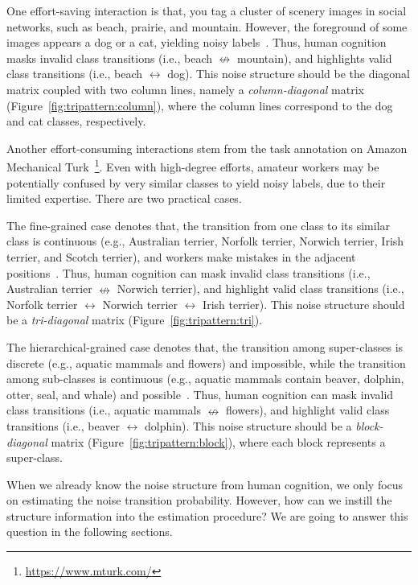 \documentclass{article}
\begin{document}
One effort-saving interaction is that, you tag a cluster of scenery images in social networks, such as beach, prairie, and mountain. However, the foreground of some images appears a dog or a cat, yielding noisy labels~\cite{ren2018learning}. Thus, human cognition masks invalid class transitions (i.e., beach $\nleftrightarrow$ mountain), and highlights valid class transitions (i.e., beach $\leftrightarrow$ dog). This noise structure should be the diagonal matrix coupled with two column lines, namely a \textit{column-diagonal} matrix (Figure~\ref{fig:tripattern:column}), where the column lines correspond to the dog and cat classes, respectively.

Another effort-consuming interactions stem from the task annotation on Amazon Mechanical Turk~\footnote{\url{https://www.mturk.com/}}. Even with high-degree efforts, amateur workers may be potentially confused by very similar classes to yield noisy labels, due to their limited expertise. There are two practical cases.

The fine-grained case denotes that, the transition from one class to its similar class is continuous (e.g., Australian terrier, Norfolk terrier, Norwich terrier, Irish terrier, and Scotch terrier), and workers make mistakes in the adjacent positions~\cite{deng2013fine}. Thus, human cognition can mask invalid class transitions (i.e., Australian terrier $\nleftrightarrow$ Norwich terrier), and highlight valid class transitions (i.e., Norfolk terrier $\leftrightarrow$ Norwich terrier $\leftrightarrow$ Irish terrier). This noise structure should be a \textit{tri-diagonal} matrix (Figure~\ref{fig:tripattern:tri}).

The hierarchical-grained case denotes that, the transition among super-classes is discrete (e.g., aquatic mammals and flowers) and impossible, while the transition among sub-classes is continuous (e.g., aquatic mammals contain beaver, dolphin, otter, seal, and whale) and possible~\cite{patrini2017making}. Thus, human cognition can mask invalid class transitions (i.e., aquatic mammals $\nleftrightarrow$ flowers), and highlight valid class transitions (i.e., beaver $\leftrightarrow$ dolphin). This noise structure should be a \textit{block-diagonal} matrix (Figure~\ref{fig:tripattern:block}), where each block represents a super-class.

When we already know the noise structure from human cognition, we only focus on estimating the noise transition probability. However, how can we instill the structure information into the estimation procedure? We are going to answer this question in the following sections.
\end{document}
